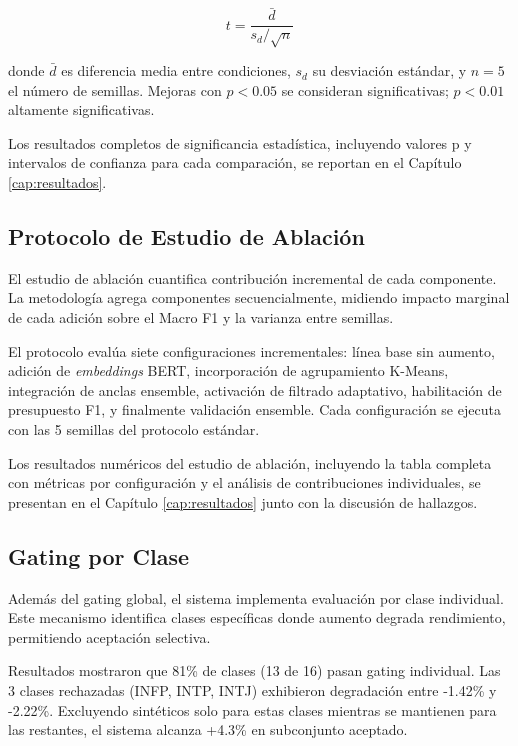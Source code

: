 \begin{equation}
t = \frac{\bar{d}}{s_d / \sqrt{n}}
\end{equation}

donde $\bar{d}$ es diferencia media entre condiciones, $s_d$ su desviación estándar, y $n=5$ el número de semillas. Mejoras con $p < 0.05$ se consideran significativas; $p < 0.01$ altamente significativas.

Los resultados completos de significancia estadística, incluyendo valores p y intervalos de confianza para cada comparación, se reportan en el Capítulo \ref{cap:resultados}.

\subsection{Protocolo de Estudio de Ablación}
\label{subsec:ablacion}

El estudio de ablación cuantifica contribución incremental de cada componente. La metodología agrega componentes secuencialmente, midiendo impacto marginal de cada adición sobre el Macro F1 y la varianza entre semillas.

El protocolo evalúa siete configuraciones incrementales: línea base sin aumento, adición de \textit{embeddings} BERT, incorporación de agrupamiento K-Means, integración de anclas ensemble, activación de filtrado adaptativo, habilitación de presupuesto F1, y finalmente validación ensemble. Cada configuración se ejecuta con las 5 semillas del protocolo estándar.

Los resultados numéricos del estudio de ablación, incluyendo la tabla completa con métricas por configuración y el análisis de contribuciones individuales, se presentan en el Capítulo \ref{cap:resultados} junto con la discusión de hallazgos.

\subsection{Gating por Clase}
\label{subsec:gating_clase}

Además del gating global, el sistema implementa evaluación por clase individual. Este mecanismo identifica clases específicas donde aumento degrada rendimiento, permitiendo aceptación selectiva.

Resultados mostraron que 81\% de clases (13 de 16) pasan gating individual. Las 3 clases rechazadas (INFP, INTP, INTJ) exhibieron degradación entre -1.42\% y -2.22\%. Excluyendo sintéticos solo para estas clases mientras se mantienen para las restantes, el sistema alcanza +4.3\% en subconjunto aceptado.

